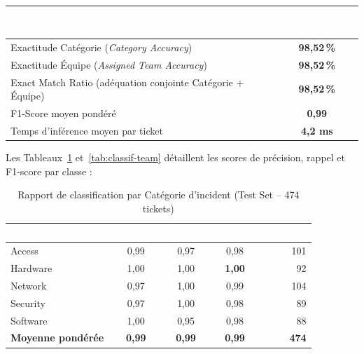 \documentclass[12pt, a4paper, oneside]{report}
\begin{document}
\begin{resultat}
\begin{center}
  \begin{tabular}{|l|c|}
    \hline
    \rowcolor{themeDark}
    \textcolor{white}{\textbf{Métrique d'évaluation}} & \textcolor{white}{\textbf{Valeur obtenue}} \\
    \hline
    Exactitude Catégorie (\textit{Category Accuracy}) & \textbf{98,52\,\%} \\
    \hline
    Exactitude Équipe (\textit{Assigned Team Accuracy}) & \textbf{98,52\,\%} \\
    \hline
    Exact Match Ratio (adéquation conjointe Catégorie + Équipe) & \textbf{98,52\,\%} \\
    \hline
    F1-Score moyen pondéré & \textbf{0,99} \\
    \hline
    Temps d'inférence moyen par ticket & \textbf{4,2 ms} \\
    \hline
  \end{tabular}
\end{center}
\end{resultat}

Les Tableaux~\ref{tab:classif-cat} et~\ref{tab:classif-team} détaillent les scores de précision, rappel et F1-score par classe :

\begin{table}[H]
\centering
\caption{Rapport de classification par Catégorie d'incident (Test Set -- 474 tickets)}
\label{tab:classif-cat}
\begin{tabular}{|l|c|c|c|r|}
\hline
\rowcolor{themeDark}
\textcolor{white}{\textbf{Catégorie}} &
\textcolor{white}{\textbf{Précision}} &
\textcolor{white}{\textbf{Rappel}} &
\textcolor{white}{\textbf{F1-Score}} &
\textcolor{white}{\textbf{Support}} \\
\hline
Access & 0,99 & 0,97 & 0,98 & 101 \\
\hline
Hardware & 1,00 & 1,00 & \textbf{1,00} & 92 \\
\hline
Network & 0,97 & 1,00 & 0,99 & 104 \\
\hline
Security & 0,97 & 1,00 & 0,98 & 89 \\
\hline
Software & 1,00 & 0,95 & 0,98 & 88 \\
\hline
\textbf{Moyenne pondérée} & \textbf{0,99} & \textbf{0,99} & \textbf{0,99} & \textbf{474} \\
\hline
\end{tabular}
\end{table}
\end{document}
